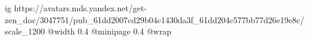  
 
 
 
 

\ifcmt
  ig https://avatars.mds.yandex.net/get-zen_doc/3047751/pub_61dd2007cd29b04c1430da3f_61dd204c577bb77d26e19e8c/scale_1200
  @width 0.4
  @minipage 0.4
  @wrap \parpic[r]
\fi
